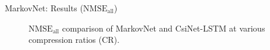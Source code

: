 \documentclass{beamer}
\begin{document}
  \begin{frame}{MarkovNet: Results ($\text{NMSE}_{\text{all}}$)}
    \begin{figure}[!hbtp] \centering 
      \vspace*{-3mm}
      \caption{$\text{NMSE}_{\text{all}}$ comparison of MarkovNet and CsiNet-LSTM 
      at various compression ratios (CR).} 
      \label{fig:diffnet_result} \vspace*{-2mm}
    \end{figure}  
  \end{frame}
\end{document}
